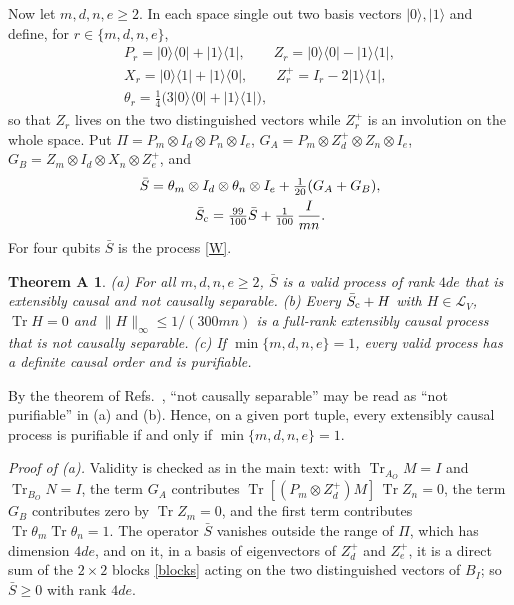 \documentclass[aps,prl,reprint,superscriptaddress,nofootinbib,longbibliography,raggedbottom]{revtex4-2}
\DeclareMathOperator{\Tr}{Tr}
\newcommand{\ket}[1]{\lvert #1\rangle}
\newcommand{\bra}[1]{\langle #1\rvert}
\newcommand{\proj}[1]{\ket{#1}\!\bra{#1}}
\newtheorem*{theoremA}{Theorem A}
\begin{document}
Now let $m,d,n,e\geq2$. In each space single out two basis vectors
$\ket0,\ket1$ and define, for $r\in\{m,d,n,e\}$,
\begin{equation}\label{A:local}
\begin{gathered}
P_r=\proj0+\proj1,\qquad Z_r=\proj0-\proj1,\\
X_r=\ket0\bra1+\ket1\bra0,\qquad Z_r^+=I_r-2\proj1,\\
\theta_r=\tfrac14\bigl(3\proj0+\proj1\bigr),
\end{gathered}
\end{equation}
so that $Z_r$ lives on the two distinguished vectors while $Z_r^+$ is an
involution on the whole space. Put $\Pi=P_m\otimes I_d\otimes P_n\otimes
I_e$, $G_A=P_m\otimes Z_d^+\otimes Z_n\otimes I_e$,
$G_B=Z_m\otimes I_d\otimes X_n\otimes Z_e^+$, and
\begin{equation}\label{A:S}
\begin{gathered}
\bar S=\theta_m\otimes I_d\otimes\theta_n\otimes I_e+\tfrac1{20}(G_A+G_B),\\
\bar S_{\rm c}=\tfrac{99}{100}\bar S+\tfrac1{100}\,\frac{I}{mn}.
\end{gathered}
\end{equation}
For four qubits $\bar S$ is the process \eqref{W}.

\begin{theoremA}
(a) For all $m,d,n,e\geq2$, $\bar S$ is a valid process of rank $4de$
that is extensibly causal and not causally separable. (b) Every
$\bar S_{\rm c}+H$ with $H\in\mathcal L_V$, $\Tr H=0$ and
$\|H\|_\infty\leq1/(300mn)$ is a full-rank extensibly causal process that
is not causally separable. (c) If $\min\{m,d,n,e\}=1$, every valid
process has a definite causal order and is purifiable.
\end{theoremA}
By the theorem of Refs.~\cite{YQSM,BLO}, ``not causally separable'' may be
read as ``not purifiable'' in (a) and (b). Hence, on a given port tuple,
every extensibly causal process is purifiable if and only if
$\min\{m,d,n,e\}=1$.

\emph{Proof of (a).} Validity is checked as in the main text: with
$\Tr_{A_O}M=I$ and $\Tr_{B_O}N=I$, the term $G_A$ contributes
$\Tr[(P_m\otimes Z_d^+)M]\,\Tr Z_n=0$, the term $G_B$ contributes zero by
$\Tr Z_m=0$, and the first term contributes $\Tr\theta_m\Tr\theta_n=1$.
The operator $\bar S$ vanishes outside the range of $\Pi$, which has
dimension $4de$, and on it, in a basis of eigenvectors of $Z_d^+$ and
$Z_e^+$, it is a direct sum of the $2\times2$ blocks \eqref{blocks} acting
on the two distinguished vectors of $B_I$; so $\bar S\geq0$ with rank
$4de$.
\end{document}
